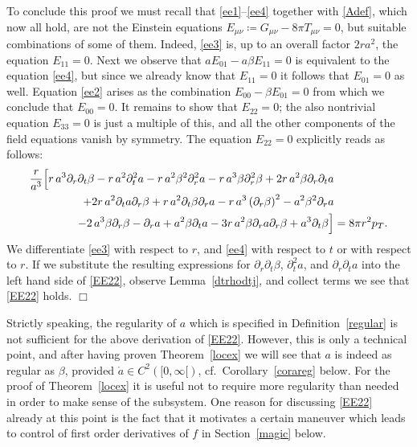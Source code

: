 \documentclass[11pt]{article}
\begin{document}
To conclude this proof we must recall that \eqref{ee1}--\eqref{ee4}
together with \eqref{Adef}, which now all hold, are not the Einstein
equations $E_{\mu\nu}\coloneqq G_{\mu\nu}- 8\pi T_{\mu\nu} = 0$, but suitable
combinations of some of them. Indeed, \eqref{ee3} is, up to an overall
factor $2 r a^2$, the equation $E_{11}=0$. Next we observe that
$a E_{01} - a\beta E_{11} = 0$ is equivalent to the equation \eqref{ee4},
but since we already know that $E_{11}=0$
it follows that $E_{01}=0$ as well.
Equation \eqref{ee2} arises as the combination
$E_{00} - \beta E_{01} =0$ from which we conclude that $E_{00}=0$.
It remains to show that $E_{22}=0$; the also nontrivial equation
$E_{33}=0$ is just a multiple of this, and all
the other components of the field equations vanish by symmetry.
The equation $E_{22}=0$ explicitly reads as follows:
\begin{align}\label{EE22}
\frac{r}{a^{3}}
\Bigl[r\, a^{3} \partial_r\partial_t\beta  - r\, a^{2} \partial^2_{t} a 
- r \,a^{2} \beta^{2} \partial^2_{r} a  
-  r \,a^{3}\beta \partial^2_{r} \beta
+ 2 r\, a^{2}\beta  \partial_r \partial_t a 
&\nonumber \\
+ 2 r\,   a^{2} \partial_t a \partial_r \beta  + r\,a^{2} \partial_t\beta
 \partial_r a 
- r\, a^{3}\left( \partial_r \beta\right)^{2}-  a^{2} \beta^{2} \partial_r a 
&\nonumber\\ 
- 2\, a^{3}\beta \partial_r \beta
- \partial_r a + a^{2}\beta  \partial_t a    
-3 r \, a^{2}\beta  \partial_r a \partial_r \beta 
+ a^{3}\partial_t\beta\Bigr]
&=
8\pi r^2 p_T.
\end{align}
We differentiate \eqref{ee3} with respect to $r$,
and \eqref{ee4} with respect to
$t$ or with respect to $r$. If we substitute the resulting expressions for
$\partial_{r}\partial_t\beta$, $\partial^2_{t} a$, and $\partial_r \partial_t a$
into the left hand side of \eqref{EE22}, observe Lemma~\ref{dtrhodtj},
and collect terms we see that \eqref{EE22} holds. \hspace*{\fill} $\Box$

\begin{remark}\label{areg}
  Strictly speaking, the regularity of $a$ which is specified in
  Definition~\ref{regular}
  is not sufficient for the above derivation of \eqref{EE22}.
  However, this is only
  a technical point, and after having proven Theorem~\ref{locex}
  we will see that
  $a$ is indeed as regular as $\beta$, provided
  $\mathring{a}\in C^2([0,\infty[)$,
  cf.\ Corollary~\ref{corareg} below.
  For the proof of Theorem~\ref{locex} it is useful not to
  require more regularity
  than needed in order to make sense of the subsystem.
  One reason for discussing
  \eqref{EE22} already at this point is the fact that it
  motivates a certain maneuver
  which leads to control of first order derivatives of $f$
  in Section~\ref{magic} below.
\end{remark}
%
%
\end{document}
